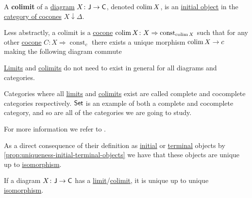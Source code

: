 \documentclass[../../main]{subfiles}
\begin{document}
\begin{definition}[Colimit]\label{def:categorical-colimit}
  A \textbf{colimit} of a \hyperref[def:diagram]{diagram} \(X\colon \mathsf{J} \to \mathsf{C}\), denoted \(\operatorname*{colim} X\), is an \hyperref[def:initial-terminal-object]{initial object} in the \hyperref[def:cone]{category of cocones} \(X \downarrow \Delta\).

  Less abstractly, a colimit is a \hyperref[def:cocone]{cocone} \(\operatorname*{colim} X\colon X \Rightarrow \operatorname{const}_{\operatorname*{colim} X}\) such that for any other \hyperref[def:cocone]{cocone} \(C\colon X \Rightarrow \operatorname{const}_{c}\) there exists a unique morphism \(\operatorname*{colim} X \to c\) making the following diagram commute
  \begin{center}
  \end{center}
\end{definition}

\begin{remark}
  \hyperref[def:categorical-limit]{Limits} and \hyperref[def:categorical-colimit]{colimits} do not need to exist in general for all diagrams and categories.
  
  Categories where all \hyperref[def:categorical-limit]{limits} and \hyperref[def:categorical-colimit]{colimits} exist are called complete and cocomplete categories respectively.
  \(\mathsf{Set}\) is an example of both a complete and cocomplete category, and so are all of the categories we are going to study.
  
  For more information we refer to \cite[Section 3.6]{riehlCategoryTheoryContext}.
\end{remark}


As a direct consequence of their definition as \hyperref[def:initial-terminal-object]{initial} or \hyperref[def:initial-terminal-object]{terminal} objects by \autoref{prop:uniqueness-initial-terminal-objects} we have that these objects are unique up to \hyperref[def:categorical-isomorphism]{isomorphism}.
\begin{proposition}
  If a diagram \(X\colon \mathsf{J} \to \mathsf{C}\) has a \hyperref[def:categorical-limit]{limit}/\hyperref[def:categorical-colimit]{colimit}, it is unique up to unique \hyperref[def:categorical-isomorphism]{isomorphism}.
\end{proposition}
\end{document}
